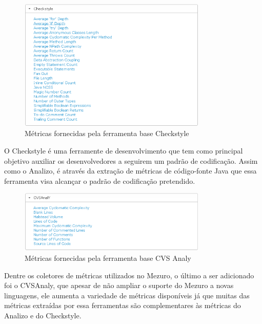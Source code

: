 \graphicspath{{figuras/}}
\begin{figure}[H]
\centering
\includegraphics[width=0.8\textwidth]{checkstyle_bt}
\caption{Métricas fornecidas pela ferramenta base Checkstyle}
\label{fig-checkstyle_bt}
\end{figure}

O Checkstyle é uma ferramente de desenvolvimento que tem como principal objetivo auxiliar os desenvolvedores a seguirem um padrão de codificação. Assim como o Analizo, é através da extração de métricas de código-fonte Java que essa ferramenta visa alcançar o padrão de codificação pretendido.

\graphicspath{{figuras/}}
\begin{figure}[H]
\centering
\includegraphics[width=0.8\textwidth]{cvsanaly_bt}
\caption{Métricas fornecidas pela ferramenta base CVS Analy}
\label{fig-cvsanaly_bt}
\end{figure}

Dentre os coletores de métricas utilizados no Mezuro, o último a ser adicionado foi o CVSAnaly, que apesar de não ampliar o suporte do Mezuro a novas linguagens, ele aumenta a variedade de métricas disponíveis já que muitas das métricas extraídas por essa ferramentas são complementares às métricas do Analizo e do Checkstyle.
